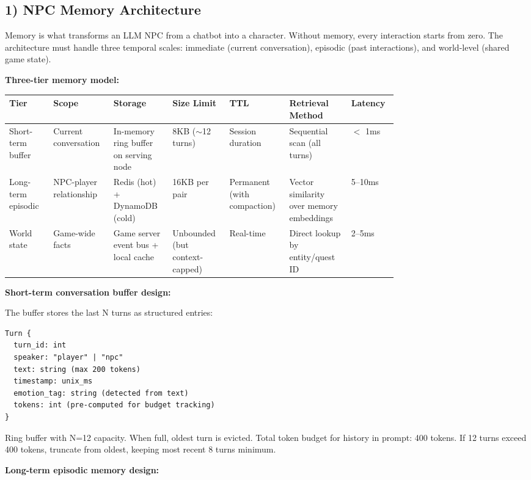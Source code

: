 \subsection*{1) NPC Memory Architecture}

Memory is what transforms an LLM NPC from a chatbot into a character. Without memory, every interaction starts from zero. The architecture must handle three temporal scales: immediate (current conversation), episodic (past interactions), and world-level (shared game state).

\textbf{Three-tier memory model:}

{\small
\begin{tabular}{|p{0.1\linewidth}|p{0.1\linewidth}|p{0.12\linewidth}|p{0.1\linewidth}|p{0.1\linewidth}|p{0.14\linewidth}|p{0.08\linewidth}|}
\hline
\textbf{Tier} & \textbf{Scope} & \textbf{Storage} & \textbf{Size Limit} & \textbf{TTL} & \textbf{Retrieval Method} & \textbf{Latency} \\
\hline
Short-term buffer & Current conversation & In-memory ring buffer on serving node & 8KB ($\sim$12 turns) & Session duration & Sequential scan (all turns) & $<$ 1ms \\
\hline
Long-term episodic & NPC-player relationship & Redis (hot) + DynamoDB (cold) & 16KB per pair & Permanent (with compaction) & Vector similarity over memory embeddings & 5--10ms \\
\hline
World state & Game-wide facts & Game server event bus + local cache & Unbounded (but context-capped) & Real-time & Direct lookup by entity/quest ID & 2--5ms \\
\hline
\end{tabular}
}

\bigskip
\textbf{Short-term conversation buffer design:}

The buffer stores the last N turns as structured entries:

\begin{verbatim}
Turn {
  turn_id: int
  speaker: "player" | "npc"
  text: string (max 200 tokens)
  timestamp: unix_ms
  emotion_tag: string (detected from text)
  tokens: int (pre-computed for budget tracking)
}
\end{verbatim}

Ring buffer with N=12 capacity. When full, oldest turn is evicted. Total token budget for history in prompt: 400 tokens. If 12 turns exceed 400 tokens, truncate from oldest, keeping most recent 8 turns minimum.

\textbf{Long-term episodic memory design:}

